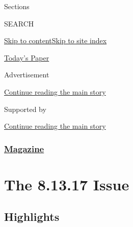 Sections

SEARCH

\protect\hyperlink{site-content}{Skip to
content}\protect\hyperlink{site-index}{Skip to site index}

\href{https://myaccount.nytimes3xbfgragh.onion/auth/login?response_type=cookie\&client_id=vi}{}

\href{https://www.nytimes3xbfgragh.onion/section/todayspaper}{Today's
Paper}

Advertisement

\protect\hyperlink{after-top}{Continue reading the main story}

Supported by

\protect\hyperlink{after-sponsor}{Continue reading the main story}

\hypertarget{magazine}{%
\subsubsection{\texorpdfstring{\href{/section/magazine}{Magazine}}{Magazine}}\label{magazine}}

\hypertarget{the-81317-issue}{%
\section{The 8.13.17 Issue}\label{the-81317-issue}}

\hypertarget{highlights}{%
\subsection{Highlights}\label{highlights}}

